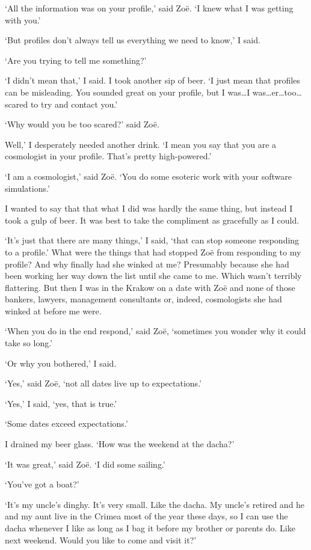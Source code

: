 `All the information was on your profile,' said Zoë. `I knew
what I was getting with you.'

`But profiles don't always tell us everything we need to know,' I
said.

`Are you trying to tell me something?'

`I didn't mean that,' I said. I took another sip of beer. `I just
mean that profiles can be misleading. You sounded great on your
profile, but I was\dots I was\dots er\dots too\dots scared to try
and contact you.'

`Why would you be too scared?' said Zoë.

Well,' I desperately needed another drink. `I mean you say that you
are a cosmologist in your profile. That's pretty high-powered.'

`I am a cosmologist,' said Zoë. `You do some esoteric work with
your software simulations.'

I wanted to say that that what I did was hardly the same thing, but
instead I took a gulp of beer. It was best to take the compliment as
gracefully as I could.

`It's just that there are many things,' I said, `that can stop
someone responding to a profile.' What were the things that had
stopped Zoë from responding to my profile? And why finally had
she winked at me? Presumably because she had been working her way down the
list until she came to me. Which wasn't terribly flattering. But then I was
in the Krakow on a date with Zoë and none of those bankers,
lawyers, management consultants or, indeed, cosmologists she had winked at before me were.

`When you do in the end respond,' said Zoë, `sometimes you
wonder why it could take so long.'

`Or why you bothered,' I said.

`Yes,' said Zoë, `not all dates live up to expectations.'

`Yes,' I said, `yes, that is true.'

`Some dates exceed expectations.'

I drained my beer glass. `How was the weekend at the dacha?'

`It was great,' said Zoë. `I did some sailing.'

`You've got a boat?'

`It's my uncle's dinghy. It's very small. Like the dacha. My uncle's
retired and he and my aunt live in the Crimea most of the year these
days, so I can use the dacha whenever I like as long as I bag it
before my brother or parents do. Like next weekend. Would you like
to come and visit it?'

